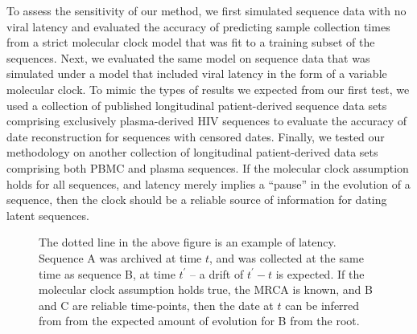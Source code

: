 To assess the sensitivity of our method, we first simulated sequence data with no viral latency and evaluated the accuracy of predicting sample collection times from a strict molecular clock model that was fit to a training subset of the sequences. 
Next, we evaluated the same model on sequence data that was simulated under a model that included viral latency in the form of a variable molecular clock.
To mimic the types of results we expected from our first test, we used a collection of published longitudinal patient-derived sequence data sets comprising exclusively plasma-derived HIV sequences \citep{McCloskey14} to evaluate the accuracy of date reconstruction for sequences with censored dates. 
Finally, we tested our methodology on another collection of longitudinal patient-derived data sets comprising both PBMC and plasma sequences. 
If the molecular clock assumption holds for all sequences, and latency merely implies a ``pause'' in the evolution of a sequence, then the clock should be a reliable source of information for dating latent sequences.

\begin{figure} \label{fig:latenttree}
	\centering
	\scalebox{5}{}
	\caption[Example of latent behavior]{The dotted line in the above figure is an example of latency. 
	Sequence A was archived at time $t$, and was collected at the same time as sequence B, at time $t^\prime$ -- a drift of $t^\prime - t$ is expected. 
	If the molecular clock assumption holds true, the MRCA is known, and B and C are reliable time-points, then the date at $t$ can be inferred from from the expected amount of evolution for B from the root.}
\end{figure}
